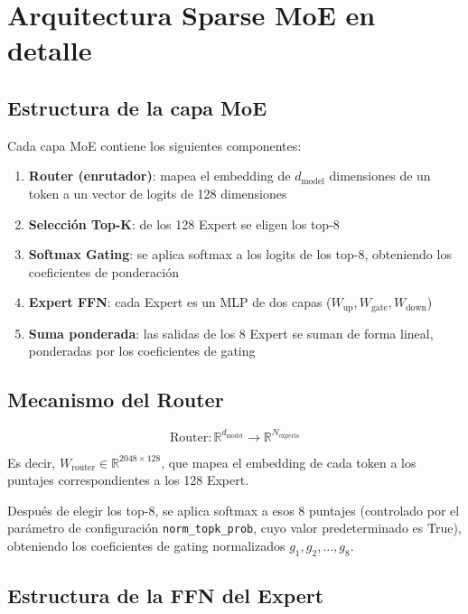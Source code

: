 \section{Arquitectura Sparse MoE en detalle}

\subsection{Estructura de la capa MoE}

Cada capa MoE contiene los siguientes componentes:

\begin{enumerate}
  \item \textbf{Router (enrutador)}: mapea el embedding de $d_{\text{model}}$ dimensiones de un token a un vector de logits de 128 dimensiones
  \item \textbf{Selección Top-K}: de los 128 Expert se eligen los top-8
  \item \textbf{Softmax Gating}: se aplica softmax a los logits de los top-8, obteniendo los coeficientes de ponderación
  \item \textbf{Expert FFN}: cada Expert es un MLP de dos capas ($W_{\text{up}}, W_{\text{gate}}, W_{\text{down}}$)
  \item \textbf{Suma ponderada}: las salidas de los 8 Expert se suman de forma lineal, ponderadas por los coeficientes de gating
\end{enumerate}

\subsection{Mecanismo del Router}

$$
\text{Router}: \mathbb{R}^{d_{\text{model}}} \to \mathbb{R}^{N_{\text{experts}}}
$$

Es decir, $W_{\text{router}} \in \mathbb{R}^{2048 \times 128}$, que mapea el embedding de cada token a los puntajes correspondientes a los 128 Expert.

Después de elegir los top-8, se aplica softmax a esos 8 puntajes (controlado por el parámetro de configuración \texttt{norm\_topk\_prob}, cuyo valor predeterminado es True), obteniendo los coeficientes de gating normalizados $g_1, g_2, \ldots, g_8$.

\subsection{Estructura de la FFN del Expert}

